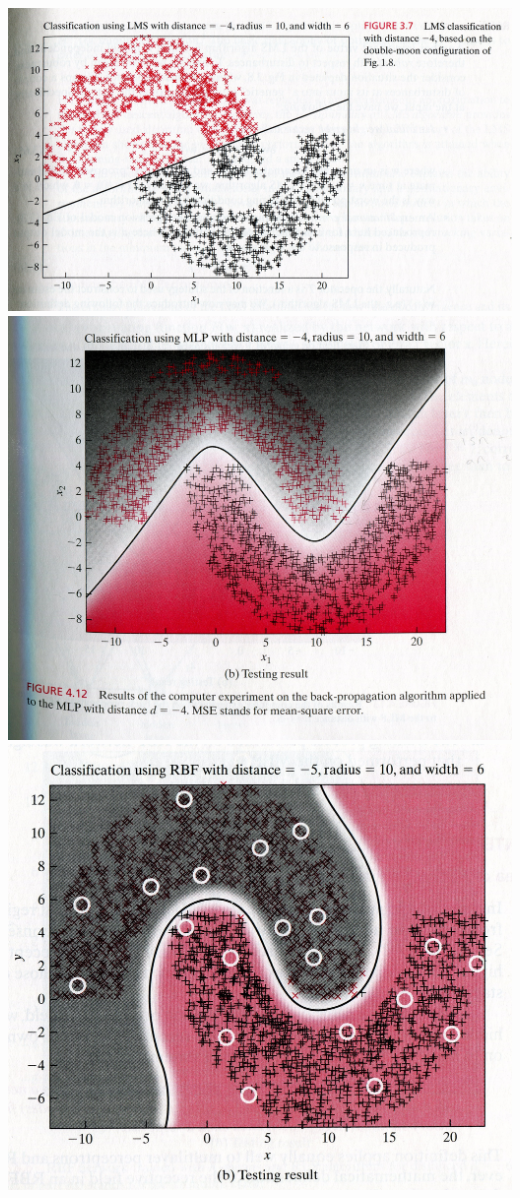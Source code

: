 \begin{enumerate}
  \begin{solution}
    \begin{center}
      \includegraphics[width=0.7\linewidth]{ex07_04_lms.jpg}
      \\
      \includegraphics[width=0.7\linewidth]{ex07_04_mlp1.jpg}
      \\
      \includegraphics[width=0.7\linewidth]{ex07_04_rbf1.jpg}
    \end{center}
  \end{solution}
  

\end{enumerate}
